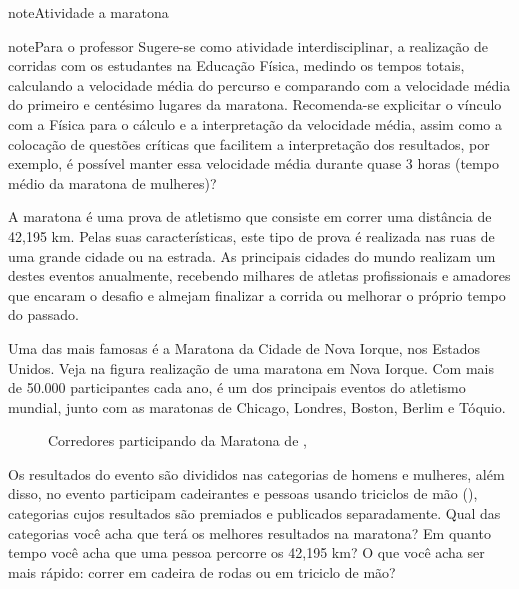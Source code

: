 \begin{sphinxadmonition}{note}{Atividade}{ a maratona}
\begin{sphinxadmonition}{note}{Para o professor}
Sugere-se como atividade interdisciplinar, a realização de corridas com os estudantes na Educação Física, medindo os tempos totais, calculando a velocidade média do percurso e comparando com a velocidade média do primeiro e centésimo lugares da maratona. Recomenda-se explicitar o vínculo com a Física para o cálculo e a interpretação da velocidade média, assim como a colocação de questões críticas que facilitem a interpretação dos resultados, por exemplo, é possível manter essa velocidade média durante quase 3 horas (tempo médio da maratona de mulheres)?
\end{sphinxadmonition}

A maratona é uma prova de atletismo que consiste em correr uma distância de 42,195 km. Pelas suas características, este tipo de prova é realizada nas ruas de uma grande cidade ou na estrada. As principais cidades do mundo realizam um destes eventos anualmente, recebendo milhares de atletas profissionais e amadores que encaram o desafio e almejam finalizar a corrida ou melhorar o próprio tempo do passado.

Uma das mais famosas é a Maratona da Cidade de Nova Iorque, nos Estados Unidos. Veja na figura {\hyperref[\detokenize{PE104-0:fig-maratona-ny}]{}} realização de uma maratona em Nova Iorque. Com mais de 50.000 participantes cada ano, é um dos principais eventos do atletismo mundial, junto com as maratonas de Chicago, Londres, Boston, Berlim e Tóquio.

\begin{figure}[H]
\centering
\capstart

\noindent{}
\caption{Corredores participando da Maratona de , }\label{\detokenize{PE104-0:fig-maratona-ny}}\label{\detokenize{PE104-0:id11}}\end{figure}

Os resultados do evento são divididos nas categorias de homens e mulheres, além disso, no evento participam cadeirantes e pessoas usando triciclos de mão (), categorias cujos resultados são premiados e publicados separadamente. Qual das categorias você acha que terá os melhores resultados na maratona? Em quanto tempo você acha que uma pessoa percorre os 42,195 km? O que você acha ser mais rápido: correr em cadeira de rodas ou em triciclo de mão?
\label{\detokenize{PE104-0:handcycle}}
\begin{figure}[H]
\centering


\end{figure}
\end{sphinxadmonition}
